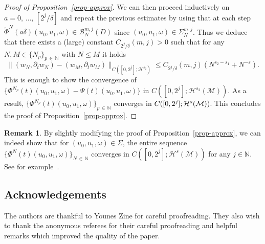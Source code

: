 \documentclass[10pt]{amsart}
\theoremstyle{definition}\newtheorem{defi}[theo]{Definition}\newtheorem{rema}[theo]{Remark}\newtheorem{exam}[theo]{Example}\newtheorem{exem}[theo]{Example}\newtheorem{nota}[theo]{Notation}
\newcommand{\N}{\mathbb{N}}
\newcommand{\B}{\mathcal{B}}
\newcommand{\M}{\mathcal{M}}
\renewcommand{\H}{\mathcal{H}}
\newcommand{\dl}{\delta}
\newcommand{\eps}{\varepsilon}
\newcommand{\Si}{\Sigma}
\newcommand{\wt}{\widetilde}
\newcommand{\dt}{\partial_t}
\renewcommand{\o}{\omega}
\begin{document}
\begin{proof}[Proof of Proposition~\ref{prop-approx}]
We can then proceed inductively on $a=0,\,\dots,\,[2^j/\dl]$ and repeat the previous estimates by using that at each step $\wt\Phi^N(a\dl)(u_0,u_1,\o)\in\B_N^{m,j}(D)$ since $(u_0,u_1,\o)\in \Si_N^{m,j}$. Thus we deduce that there exists a (large) constant $C_{2^j/\dl}(m,j)>0$ such that for any $N,M \in \{N_p\}_{p\,\in\,\N}$ with $N\le M$ it holds
\begin{equation}
\big\|(w_N, \dt w_N)-(w_M,\dt w_M)\big\|_{C\left([0,2^j];\H^{s_2}\right)} \le C_{2^j/\dl}(m,j)\left(N^{s_2-s_1}+N^{-\eps}\right).
\end{equation}
This is enough to show the convergence of $\{\Phi^{N_p}(t)(u_0,u_1,\o)-\Psi(t)(u_0,u_1,\o)\}$ in $C([0,2^j];\H^{s_2}(\M))$. As a result, $\big\{\Phi^{N_p}(t)(u_0,u_1,\o)\big\}_{p\,\in\,\N}$ converges in $C([0,2^j];\linebreak\H^s(\M))$. This concludes the proof of Proposition~\ref{prop-approx}.
\end{proof}

\begin{rema}
By slightly modifying the proof of Proposition~\ref{prop-approx}, we can indeed show that for $(u_0,u_1,\o)\in\Sigma$, the entire sequence $\big\{\Phi^N(t)(u_0,u_1,\o)\big\}_{N\,\in\,\N}$ converges in $C([0,2^j];\H^s(\M))$ for any $j\in\N$. See for example~\cite[Corollary~9.11]{OOT}.
\end{rema}

\subsection*{Acknowledgements}
The authors are thankful to Younes Zine for careful proofreading. They also wish to thank the anonymous referees for their careful proofreading and helpful remarks which improved the quality of the paper.
\end{document}
